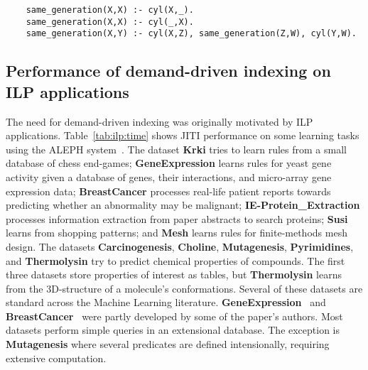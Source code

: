 \documentclass{llncs}
\newcommand{\JITI}{demand-driven indexing\xspace}
\newcommand{\bench}[1]{\textbf{\textsf{#1}}}
\newcommand{\BreastCancer}{\bench{BreastCancer}\xspace}
\newcommand{\Carcinogenesis}{\bench{Carcinogenesis}\xspace}
\newcommand{\Choline}{\bench{Choline}\xspace}
\newcommand{\GeneExpression}{\bench{GeneExpression}\xspace}
\newcommand{\IEProtein}{\bench{IE-Protein\_Extraction}\xspace}
\newcommand{\Krki}{\bench{Krki}\xspace}
\newcommand{\Mesh}{\bench{Mesh}\xspace}
\newcommand{\Mutagenesis}{\bench{Mutagenesis}\xspace}
\newcommand{\Pyrimidines}{\bench{Pyrimidines}\xspace}
\newcommand{\Susi}{\bench{Susi}\xspace}
\newcommand{\Thermolysin}{\bench{Thermolysin}\xspace}
\begin{document}
\begin{small}
  \begin{verbatim}
    same_generation(X,X) :- cyl(X,_).
    same_generation(X,X) :- cyl(_,X).
    same_generation(X,Y) :- cyl(X,Z), same_generation(Z,W), cyl(Y,W).
  \end{verbatim}
\end{small}


\subsection{Performance of \JITI on ILP applications} \label{sec:perf:ILP}
The need for \JITI was originally motivated by ILP applications.
Table~\ref{tab:ilp:time} shows JITI performance on some learning tasks
using the ALEPH system~\cite{ALEPH}. The dataset \Krki tries to
learn rules from a small database of chess end-games;
\GeneExpression learns rules for yeast gene activity given a
database of genes, their interactions, and micro-array gene expression
data; \BreastCancer processes real-life patient reports towards
predicting whether an abnormality may be malignant;
\IEProtein processes information extraction from
paper abstracts to search proteins; \Susi learns from shopping
patterns; and \Mesh learns rules for finite-methods mesh
design. The datasets \Carcinogenesis, \Choline,
\Mutagenesis, \Pyrimidines, and \Thermolysin try to
predict chemical properties of compounds. The first three
datasets store properties of interest as tables, but
\Thermolysin learns from the 3D-structure of a molecule's
conformations. Several of these datasets are standard across the Machine
Learning literature. \GeneExpression~\cite{} and
\BreastCancer~\cite{} were partly developed by some of the
paper's authors. Most datasets perform simple queries in an
extensional database. The exception is \Mutagenesis where
several predicates are defined intensionally, requiring extensive
computation.
\end{document}
